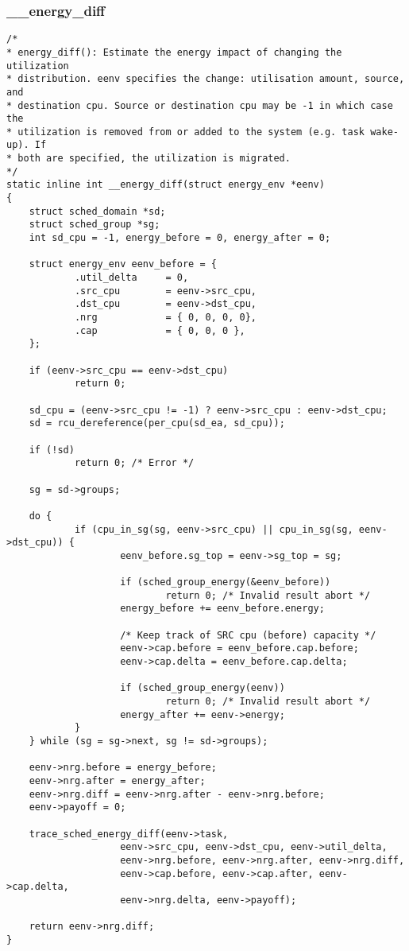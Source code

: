 \documentclass{article}
\begin{document}
\subsubsection{\_\_energy\_diff}

\begin{verbatim}
/*
* energy_diff(): Estimate the energy impact of changing the utilization
* distribution. eenv specifies the change: utilisation amount, source, and
* destination cpu. Source or destination cpu may be -1 in which case the
* utilization is removed from or added to the system (e.g. task wake-up). If
* both are specified, the utilization is migrated.
*/
static inline int __energy_diff(struct energy_env *eenv)
{
    struct sched_domain *sd;
    struct sched_group *sg;
    int sd_cpu = -1, energy_before = 0, energy_after = 0;

    struct energy_env eenv_before = {
            .util_delta     = 0,
            .src_cpu        = eenv->src_cpu,
            .dst_cpu        = eenv->dst_cpu,
            .nrg            = { 0, 0, 0, 0},
            .cap            = { 0, 0, 0 },
    };

    if (eenv->src_cpu == eenv->dst_cpu)
            return 0;

    sd_cpu = (eenv->src_cpu != -1) ? eenv->src_cpu : eenv->dst_cpu;
    sd = rcu_dereference(per_cpu(sd_ea, sd_cpu));

    if (!sd)
            return 0; /* Error */

    sg = sd->groups;

    do {
            if (cpu_in_sg(sg, eenv->src_cpu) || cpu_in_sg(sg, eenv->dst_cpu)) {
                    eenv_before.sg_top = eenv->sg_top = sg;

                    if (sched_group_energy(&eenv_before))
                            return 0; /* Invalid result abort */
                    energy_before += eenv_before.energy;

                    /* Keep track of SRC cpu (before) capacity */
                    eenv->cap.before = eenv_before.cap.before;
                    eenv->cap.delta = eenv_before.cap.delta;

                    if (sched_group_energy(eenv))
                            return 0; /* Invalid result abort */
                    energy_after += eenv->energy;
            }
    } while (sg = sg->next, sg != sd->groups);

    eenv->nrg.before = energy_before;
    eenv->nrg.after = energy_after;
    eenv->nrg.diff = eenv->nrg.after - eenv->nrg.before;
    eenv->payoff = 0;

    trace_sched_energy_diff(eenv->task,
                    eenv->src_cpu, eenv->dst_cpu, eenv->util_delta,
                    eenv->nrg.before, eenv->nrg.after, eenv->nrg.diff,
                    eenv->cap.before, eenv->cap.after, eenv->cap.delta,
                    eenv->nrg.delta, eenv->payoff);

    return eenv->nrg.diff;
}
\end{verbatim}
\end{document}
